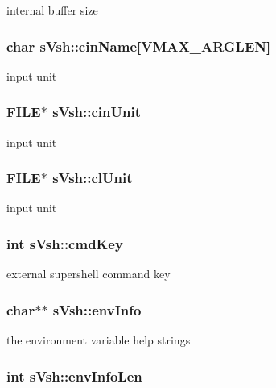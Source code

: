 internal buffer size 

\subsubsection[{cinName}]{\setlength{\rightskip}{0pt plus 5cm}char {\bf sVsh::cinName}[VMAX\_\-ARGLEN]}\label{a00007_a4f656d4cfedad44dfa387f941aaf1f70}


input unit 

\subsubsection[{cinUnit}]{\setlength{\rightskip}{0pt plus 5cm}FILE$\ast$ {\bf sVsh::cinUnit}}\label{a00007_aafb169c1a906339713936d6434f1aab2}


input unit 

\subsubsection[{clUnit}]{\setlength{\rightskip}{0pt plus 5cm}FILE$\ast$ {\bf sVsh::clUnit}}\label{a00007_a61c33aa2071b43a85120b75d3984eeb3}


input unit 

\subsubsection[{cmdKey}]{\setlength{\rightskip}{0pt plus 5cm}int {\bf sVsh::cmdKey}}\label{a00007_aa246875bf82605333f30af61afe3ed54}


external supershell command key 

\subsubsection[{envInfo}]{\setlength{\rightskip}{0pt plus 5cm}char$\ast$$\ast$ {\bf sVsh::envInfo}}\label{a00007_a4b13b56b6059a20538b0eca39b1872b0}


the environment variable help strings 

\subsubsection[{envInfoLen}]{\setlength{\rightskip}{0pt plus 5cm}int {\bf sVsh::envInfoLen}}\label{a00007_a9f3e8263b78fe0574642e64ee6e30998}


